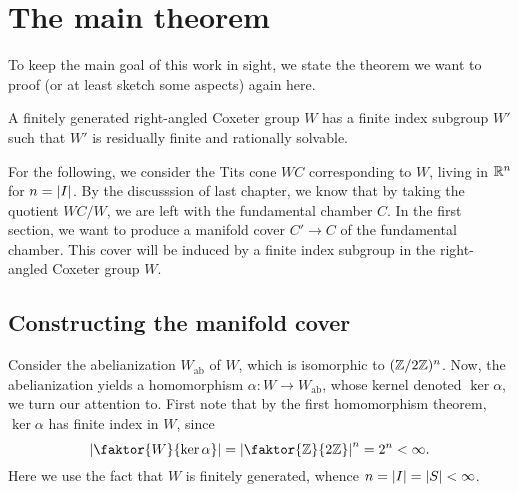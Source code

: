 \chapter{The main theorem}

To keep the main goal of this work in sight, we state the theorem we want to proof (or at least sketch some aspects) again here.

\begin{theorem*}
    A finitely generated right-angled Coxeter group \(W\) has a finite index subgroup \(W'\) such that \(W'\) is residually finite and rationally solvable.
\end{theorem*}


For the following, we consider the Tits cone \(WC\) corresponding to \(W\), living in \(\mathbb{R}^n\) for \(n = \left\vert I\right\vert\).
By the discusssion of last chapter, we know that by taking the quotient \(WC/W\), we are left with the fundamental chamber \(C\).
In the first section, we want to produce a manifold cover \(C' \to C\) of the fundamental chamber.
This cover will be induced by a finite index subgroup in the right-angled Coxeter group \(W\).


\section{Constructing the manifold cover}

Consider the abelianization \(W_{\text{ab}}\) of \(W\), which is isomorphic to \((\mathbb{Z}/2\mathbb{Z})^{n}\).
Now, the abelianization yields a homomorphism \(\alpha : W \to W_{\text{ab}}\), whose kernel denoted \(\ker\alpha\), we turn our attention to. %
First note that by the first homomorphism theorem, \(\ker\alpha\) has finite index in \(W\), since
\[\abs{\faktor{W}{\ker\alpha}} = \abs{\faktor{\Z}{2\Z}}^{n} = 2^{n} < \infty.\]
Here we use the fact that \(W\) is finitely generated, whence \(n = \left\vert I\right\vert = \left\vert S\right\vert < \infty\).

